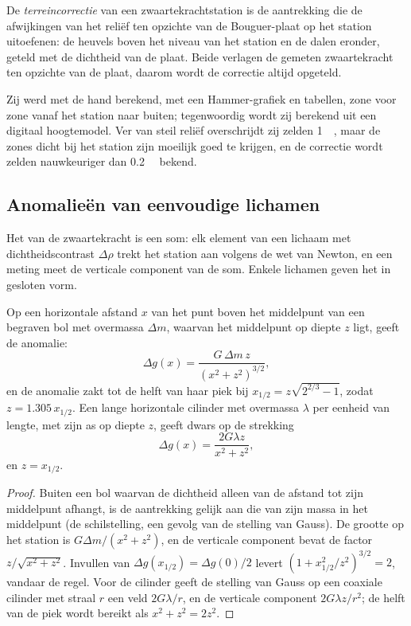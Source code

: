 \begin{definition}[Terreincorrectie]\label{def:b3:field-lab-methods-3:terrain}
De \emph{terreincorrectie} van een
zwaartekrachtstation is de aantrekking die de afwijkingen van het reliëf ten opzichte van de
Bouguer-plaat op het station uitoefenen: de heuvels boven het niveau van het station en
de dalen eronder, geteld met de dichtheid van de plaat. Beide verlagen
de gemeten zwaartekracht ten opzichte van de plaat, daarom wordt de
correctie altijd opgeteld.
\end{definition}

Zij werd met de hand berekend, met een Hammer-grafiek en tabellen, zone voor zone
vanaf het station naar buiten; tegenwoordig wordt zij berekend uit een digitaal
hoogtemodel. Ver van steil reliëf overschrijdt zij zelden \qty{1}{\milli\gal},
maar de zones dicht bij het station zijn moeilijk goed te krijgen, en de
correctie wordt zelden nauwkeuriger dan \qty{0.2}{\milli\gal} bekend.

\subsection{Anomalieën van eenvoudige lichamen}

Het  van de zwaartekracht is een som: elk element van een lichaam
met dichtheidscontrast $\Delta\rho$ trekt het station aan volgens de wet van Newton, en
een meting meet de verticale component van de som. Enkele lichamen geven
het in gesloten vorm.

\begin{theorem}\label{thm:b3:field-lab-methods-3:sphere}
Op een horizontale afstand $x$ van het punt boven het middelpunt van een
begraven bol met overmassa $\Delta m$, waarvan het middelpunt op diepte $z$ ligt, geeft de
anomalie:
\[
\Delta g(x) = \frac{G\,\Delta m\,z}{(x^2 + z^2)^{3/2}} ,
\]
en de anomalie zakt tot de helft van haar piek bij $x_{1/2} = z\sqrt{2^{2/3} - 1}$,
zodat $z = 1.305\,x_{1/2}$. Een lange horizontale cilinder met overmassa
$\lambda$ per eenheid van lengte, met zijn as op diepte $z$, geeft dwars op
de strekking
\[
\Delta g(x) = \frac{2G\lambda z}{x^2 + z^2} ,
\]
en $z = x_{1/2}$.
\end{theorem}

\begin{proof}
Buiten een bol waarvan de dichtheid alleen van de afstand tot zijn
middelpunt afhangt, is de aantrekking gelijk aan die van zijn massa in het middelpunt (de
schilstelling, een gevolg van de stelling van Gauss). De grootte op het
station is $G\Delta m/(x^2 + z^2)$, en de verticale component bevat
de factor $z/\sqrt{x^2 + z^2}$. Invullen van $\Delta g(x_{1/2}) =
\Delta g(0)/2$ levert $(1 + x_{1/2}^2/z^2)^{3/2} = 2$, vandaar de regel. Voor
de cilinder geeft de stelling van Gauss op een coaxiale cilinder met straal $r$
een veld $2G\lambda/r$, en de verticale component $2G\lambda z/r^2$;
de helft van de piek wordt bereikt als $x^2 + z^2 = 2z^2$.
\end{proof}


